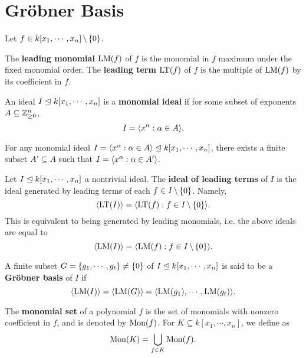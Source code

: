 \chapter{Gr\"obner Basis}

Let \(f \in k[x_1, \cdots, x_n] \,\backslash\, \{ 0 \}\).

\begin{definition} %
    \label{def:LeadingMonomialTerm}
    The \textbf{leading monomial} \(\mathrm{LM}(f)\) of \(f\) is the monomial in
    \(f\) maximum under the fixed monomial order. The \textbf{leading term}
    \(\mathrm{LT}(f)\) of \(f\) is the multiple of \(\mathrm{LM}(f)\) by its
    coefficient in \(f\).
\end{definition}

\begin{definition} %
    \label{def:MonomialIdeal}
    An ideal \(I \trianglelefteq k[x_1, \cdots, x_n]\) is a \textbf{monomial ideal}
    if for some subset of exponents \(A \subseteq \mathbb{Z}_{\ge 0}^n\),
    \[I = \langle x^\alpha : \alpha \in A \rangle.\]
\end{definition}

\begin{theorem} %
    \label{thm:DicksonLemma}
    For any monomial ideal \(I = \langle x^\alpha : \alpha \in A \rangle \trianglelefteq
    k[x_1, \cdots, x_n]\), there exists a finite subset \(A' \subseteq A\)
    such that \(I = \langle x^\alpha : \alpha \in A' \rangle\).
\end{theorem}

\begin{definition} %
    \label{def:LeadTermIdeal}
    Let \(I \trianglelefteq k[x_1, \cdots, x_n]\) a nontrivial ideal. The
    \textbf{ideal of leading terms} of \(I\) is the ideal generated by leading
    terms of each \(f \in I \,\backslash\, \{ 0 \}\). Namely,
    \[\langle \mathrm{LT}(I) \rangle
    = \langle \mathrm{LT}(f) : f \in I \,\backslash\, \{ 0 \} \rangle.\]
    This is equivalent to being generated by leading monomials, i.e. the above
    ideals are equal to
    \[\langle \mathrm{LM}(I) \rangle
    = \langle \mathrm{LM}(f) : f \in I \,\backslash\, \{ 0 \} \rangle.\]
\end{definition}

\begin{definition} %
    \label{def:GroebnerBasis}
    A finite subset \(G = \{ g_1, \cdots, g_t \} \ne \{ 0 \}\) of \(I \trianglelefteq
    k[x_1, \cdots, x_n]\) is said to be a \textbf{Gr{\"o}bner basis} of \(I\) if
    \[\langle \mathrm{LM}(I) \rangle = \langle \mathrm{LM}(G) \rangle
    = \langle \mathrm{LM}(g_1), \cdots, \mathrm{LM}(g_t) \rangle.\]
\end{definition}

\begin{definition}
    \label{def:MonomialSet}
    The \textbf{monomial set} of a polynomial \(f\) is the set of monomials with
    nonzero coefficient in \(f\), and is denoted by \(\mathrm{Mon}(f)\). For \(K
    \subseteq k[x_1, \cdots, x_n]\), we define as
    \[\mathrm{Mon}(K) = \bigcup_{f \in K} \mathrm{Mon}(f).\]
\end{definition}